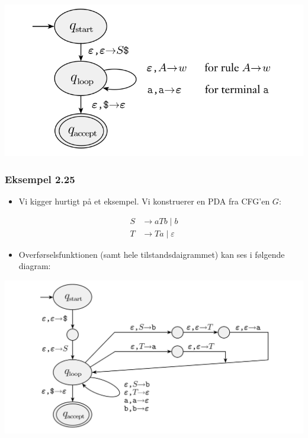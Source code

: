 \begin{frame}[allowframebreaks]
\begin{itemize}
		      \includegraphics[scale=0.3]{figur/figur224.png}
	\end{itemize}
\end{frame}

\begin{frame}[allowframebreaks]
	\frametitle{Eksempel 2.25}

	\begin{itemize}
		\item Vi kigger hurtigt på et eksempel. Vi konstruerer en PDA fra CFG'en $G$:
	\end{itemize}
	\begin{align*}
		S & \rightarrow aTb \mid b          \\
		T & \rightarrow Ta \mid \varepsilon
	\end{align*}

	\begin{itemize}
		\item Overførselsfunktionen (samt hele tilstandsdaigrammet) kan ses i følgende diagram:
	\end{itemize}

	\includegraphics[scale=0.3]{figur/figur226.png}

\end{frame}




